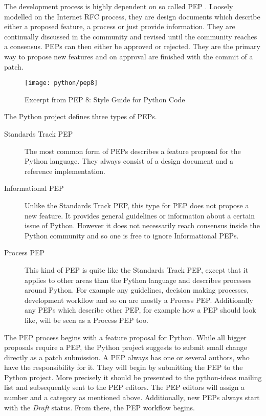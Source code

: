 The development process is highly dependent on so called \ac{PEP}
\cite{Warsaw2000}. Loosely modelled on the Internet RFC process, they are
design documents which describe either a proposed feature, a process or just
provide information. They are continually discussed in the community and
revised until the community reaches a consensus. \acp{PEP} can then either be
approved or rejected. They are the primary way to propose new features and on
approval are finished with the commit of a patch.

\begin{figure}[htbp]
  \centering
  \texttt{[image: python/pep8]}
  \caption{Excerpt from \ac{PEP} 8: Style Guide for Python Code}
\end{figure}

The Python project defines three types of \acp{PEP}.

\begin{description}

  \item[Standards Track PEP] The most common form of \acp{PEP} describes a
    feature proposal for the Python language. They always consist of a design
    document and a reference implementation.

  \item[Informational PEP] Unlike the Standards Track \ac{PEP}, this type for
    \ac{PEP} does not propose a new feature. It provides general guidelines or
    information about a certain issue of Python. However it does not
    necessarily reach consensus inside the Python community and so one is free
    to ignore Informational \acp{PEP}.

  \item[Process PEP] This kind of \ac{PEP} is quite like the Standards Track
    \ac{PEP}, except that it applies to other areas than the Python language
    and describes processes around Python. For example any guidelines, decision
    making processes, development workflow and so on are mostly a Process
    \ac{PEP}. Additionally any \acp{PEP} which describe other \ac{PEP}, for
    example how a \ac{PEP} should look like, will be seen as a Process \ac{PEP}
    too.

\end{description}

The \ac{PEP} process begins with a feature proposal for Python. While all
bigger proposals require a \ac{PEP}, the Python project suggests to submit
small change directly as a patch submission. A \ac{PEP} always has one or
several authors, who have the responsibility for it. They will begin by
submitting the \ac{PEP} to the Python project. More precisely it should be
presented to the python-ideas mailing list and subsequently sent to the
\ac{PEP} editors. The \ac{PEP} editors will assign a number and a category as
mentioned above. Additionally, new \acp{PEP} always start with the \emph{Draft}
status. From there, the \ac{PEP} workflow begins.

